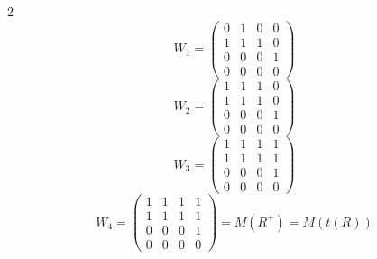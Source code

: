 \documentclass[12pt]{article}
\newenvironment{firstlayer}%
{\begin{list}{}{\renewcommand{\makelabel}[1]{\textbf{##1}.\hfil}
}}
{\end{list}}
\newenvironment{secondlayer}%
{\begin{list}{}{\renewcommand{\makelabel}[1]{(##1)\hfil}
}}
{\end{list}}
\begin{document}
\begin{CJK}{UTF8}{gbsn}
\begin{firstlayer}
\begin{secondlayer}
\begin{center}
\begin{tikzpicture}
\end{tikzpicture}
\end{center}
        \item[2]
        \begin{equation*}
          W_1=\left(\begin{matrix}
    0 & 1 & 0 & 0 \\
    1 & 1 & 1 & 0 \\
    0 & 0 & 0 & 1 \\
    0 & 0 & 0 & 0
\end{matrix}\right)
        \end{equation*}
        \begin{equation*}
          W_2=\left(\begin{matrix}
    1 & 1 & 1 & 0 \\
    1 & 1 & 1 & 0 \\
    0 & 0 & 0 & 1 \\
    0 & 0 & 0 & 0
\end{matrix}\right)
        \end{equation*}
        \begin{equation*}
          W_3=\left(\begin{matrix}
    1 & 1 & 1 & 1 \\
    1 & 1 & 1 & 1 \\
    0 & 0 & 0 & 1 \\
    0 & 0 & 0 & 0
\end{matrix}\right)
        \end{equation*}
        \begin{equation*}
          W_4=\left(\begin{matrix}
    1 & 1 & 1 & 1 \\
    1 & 1 & 1 & 1 \\
    0 & 0 & 0 & 1 \\
    0 & 0 & 0 & 0
\end{matrix}\right)=M(R^+)=M(t(R))
        \end{equation*}
       \end{secondlayer}
\end{firstlayer}

\end{CJK}
\end{document}
